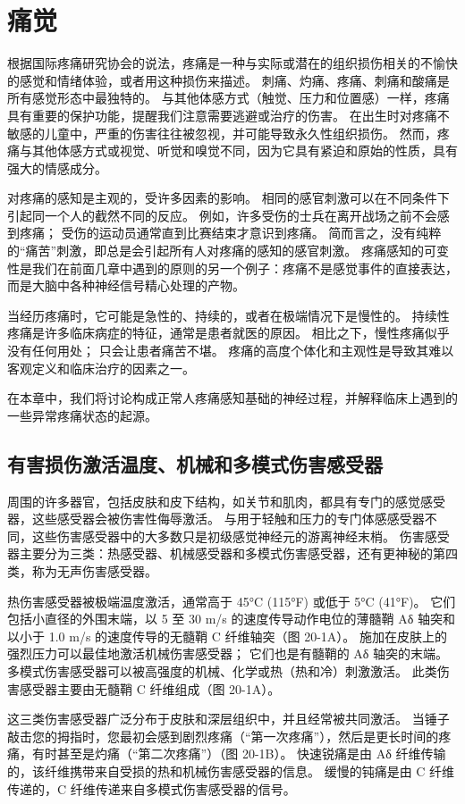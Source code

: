 \chapter{痛觉}
根据国际疼痛研究协会的说法，疼痛是一种与实际或潜在的组织损伤相关的不愉快的感觉和情绪体验，或者用这种损伤来描述。 刺痛、灼痛、疼痛、刺痛和酸痛是所有感觉形态中最独特的。 与其他体感方式（触觉、压力和位置感）一样，疼痛具有重要的保护功能，提醒我们注意需要逃避或治疗的伤害。 在出生时对疼痛不敏感的儿童中，严重的伤害往往被忽视，并可能导致永久性组织损伤。 然而，疼痛与其他体感方式或视觉、听觉和嗅觉不同，因为它具有紧迫和原始的性质，具有强大的情感成分。

对疼痛的感知是主观的，受许多因素的影响。 相同的感官刺激可以在不同条件下引起同一个人的截然不同的反应。 例如，许多受伤的士兵在离开战场之前不会感到疼痛； 受伤的运动员通常直到比赛结束才意识到疼痛。 简而言之，没有纯粹的“痛苦”刺激，即总是会引起所有人对疼痛的感知的感官刺激。 疼痛感知的可变性是我们在前面几章中遇到的原则的另一个例子：疼痛不是感觉事件的直接表达，而是大脑中各种神经信号精心处理的产物。

当经历疼痛时，它可能是急性的、持续的，或者在极端情况下是慢性的。 持续性疼痛是许多临床病症的特征，通常是患者就医的原因。 相比之下，慢性疼痛似乎没有任何用处； 只会让患者痛苦不堪。 疼痛的高度个体化和主观性是导致其难以客观定义和临床治疗的因素之一。

在本章中，我们将讨论构成正常人疼痛感知基础的神经过程，并解释临床上遇到的一些异常疼痛状态的起源。


\section{有害损伤激活温度、机械和多模式伤害感受器}
周围的许多器官，包括皮肤和皮下结构，如关节和肌肉，都具有专门的感觉感受器，这些感受器会被伤害性侮辱激活。 与用于轻触和压力的专门体感感受器不同，这些伤害感受器中的大多数只是初级感觉神经元的游离神经末梢。 伤害感受器主要分为三类：热感受器、机械感受器和多模式伤害感受器，还有更神秘的第四类，称为无声伤害感受器。

热伤害感受器被极端温度激活，通常高于 45°C (115°F) 或低于 5°C (41°F)。 它们包括小直径的外围末端，以 5 至 30 m/s 的速度传导动作电位的薄髓鞘 Aδ 轴突和以小于 1.0 m/s 的速度传导的无髓鞘 C 纤维轴突（图 20-1A）。 施加在皮肤上的强烈压力可以最佳地激活机械伤害感受器； 它们也是有髓鞘的 Aδ 轴突的末端。 多模式伤害感受器可以被高强度的机械、化学或热（热和冷）刺激激活。 此类伤害感受器主要由无髓鞘 C 纤维组成（图 20-1A）。

这三类伤害感受器广泛分布于皮肤和深层组织中，并且经常被共同激活。 当锤子敲击您的拇指时，您最初会感到剧烈疼痛（“第一次疼痛”），然后是更长时间的疼痛，有时甚至是灼痛（“第二次疼痛”）（图 20-1B）。 快速锐痛是由 Aδ 纤维传输的，该纤维携带来自受损的热和机械伤害感受器的信息。 缓慢的钝痛是由 C 纤维传递的，C 纤维传递来自多模式伤害感受器的信号。

